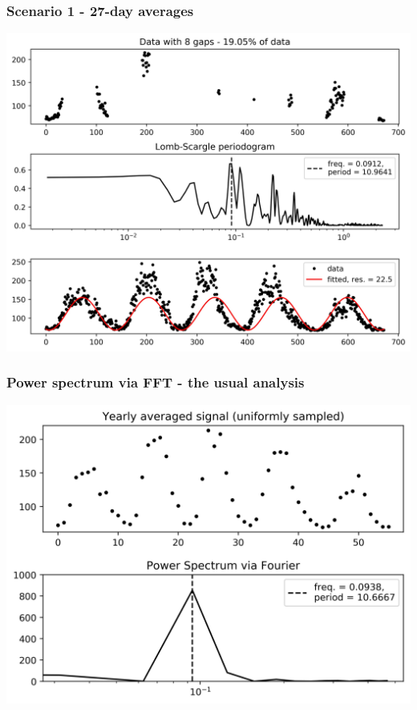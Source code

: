 \documentclass{beamer}
\begin{document}
\begin{frame}
\frametitle{Scenario 1 - 27-day averages}
\begin{center}
\includegraphics[scale=0.55]{../scripts/dataset2/periodograms_ny2.0_model2_Ng8.jpg}
\end{center}
\end{frame}

\begin{frame}
\frametitle{Power spectrum via FFT - the usual analysis}
\begin{center}
\includegraphics[scale=0.55]{Figuras/original_1.jpg}
\end{center}
\end{frame}
\end{document}
